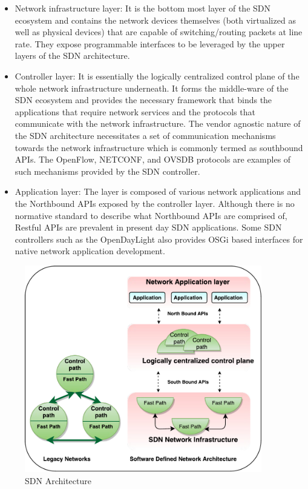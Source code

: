 \begin{itemize}
 \item Network infrastructure layer: It is the bottom most layer of the SDN ecosystem and contains the network devices themselves (both virtualized as well as physical devices) that are capable of switching/routing packets at line rate. They expose programmable interfaces to be leveraged by the upper layers of the SDN architecture.
 \item Controller layer: It is essentially the logically centralized control plane of the whole network infrastructure underneath. It forms the middle-ware of the SDN ecosystem and provides the necessary framework that binds the applications that require network services and the protocols that communicate with the network infrastructure. The vendor agnostic nature of the SDN architecture necessitates a set of communication mechanisms towards the network infrastructure which is commonly termed as southbound APIs. The OpenFlow, NETCONF, and OVSDB protocols are examples of such mechanisms provided by the SDN controller. 
 \item Application layer: The layer is composed of various network applications and the Northbound APIs exposed by the controller layer. Although there is no normative standard to describe what  Northbound APIs are comprised of, Restful APIs are prevalent in present day SDN applications. Some SDN controllers such as the OpenDayLight also provides OSGi based interfaces for native network application development.
\end{itemize}


\begin{figure}[H]
 \centering
 \caption{SDN Architecture}
 \includegraphics[height=9cm]{SDN-Architecture05.pdf}
\end{figure}

